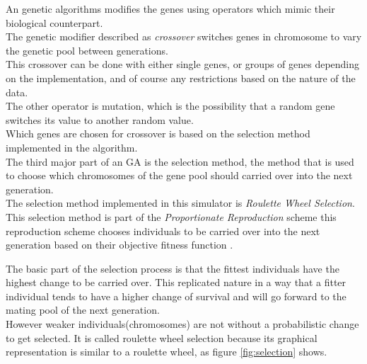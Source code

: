 An genetic algorithms modifies the genes using operators which mimic their biological counterpart. \\

The genetic modifier described as \textit{crossover} switches genes in chromosome to vary the genetic pool between generations. \\
This crossover can be done with either single genes, or groups of genes depending on the implementation, and of course any restrictions based on the nature of the data. \\

The other operator is mutation, which is the possibility that a random gene switches its value to another random value.\\
Which genes are chosen for crossover is based on the selection method implemented in the algorithm. \\
The third major part of an GA is the selection method, the method that is used to choose which chromosomes of the gene pool should carried over into the next generation.\\
The selection method implemented in this simulator is \textit{Roulette Wheel Selection}. 
This selection method is part of the \textit{Proportionate Reproduction} scheme this reproduction scheme chooses individuals to be carried over into the next generation based on their objective fitness function \cite{goldberg1991comparative}. 

The basic part of the selection process is that the fittest individuals have the highest change to be carried over. This replicated nature in a way that a fitter individual tends to have a higher change of survival and will go forward to the mating pool of the next generation.\\
However weaker individuals(chromosomes) are not without a probabilistic change to get selected. 
It is called roulette wheel selection because its graphical representation is similar to a roulette wheel, as figure \ref{fig:selection} shows\cite{1631619}.

